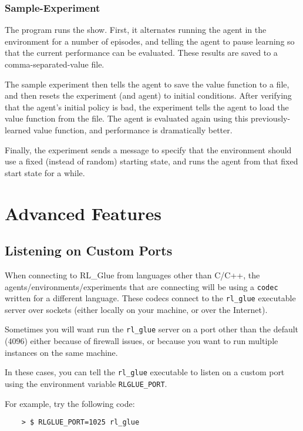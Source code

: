 \documentclass[11pt]{article}
\begin{document}
\subsubsection{Sample-Experiment}
The  program runs the show.  First, it alternates running the agent in the environment for a number of episodes, and telling the agent to pause learning so that the current performance can be evaluated.  These results are saved to a comma-separated-value file.

The sample experiment then tells the agent to save the value function to a file, and then resets the experiment (and agent) to initial conditions.  After verifying that the agent's initial policy is bad, the experiment tells the agent to load the value function from the file.  The agent is evaluated again using this previously-learned value function, and performance is dramatically better.

Finally, the experiment sends a message to specify that the environment should use a fixed (instead of random) starting state, and runs the agent from that fixed start state for a while.

\section{Advanced Features}
\subsection{Listening on Custom Ports}
When connecting to RL\_Glue from languages other than C/C++, the agents/environments/experiments that are connecting will be using a \texttt{codec} written for a different language.  These codecs connect to the \texttt{rl\_glue} executable server over sockets (either locally on your machine, or over the Internet).

Sometimes you will want run the \texttt{rl\_glue} server on a port other than the default
($4096$) either because of firewall issues, or because you want to run multiple instances on the same machine.

In these cases, you can tell the \texttt{rl\_glue} executable to listen on a custom port using the environment variable \texttt{RLGLUE\_PORT}.

For example, try the following code:
\begin{verbatim}
	> $ RLGLUE_PORT=1025 rl_glue
\end{verbatim}
\end{document}
